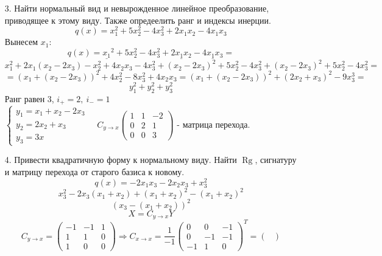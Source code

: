 \documentclass[12pt, letterpaper, twoside]{article}
\newcommand{\Rg}{\operatorname{Rg}}
\begin{document}
        \begin{enumerate}
            \item[3.] Найти нормальный вид и невырожденное линейное преобразование, приводящее к этому виду. Также опредеелить ранг и индексы инерции.
            \[q(x) = x_1^2 + 5x^2_2 - 4x_3^2 + 2x_1x_2 - 4x_1x_3\]
            Вынесем $x_1$:
            \[q(x) = \underline{x_1}^2 + 5x^2_2 - 4x_3^2 + \underline{2x_1x_2} - \underline{4x_1x_3} =\]
            \[x_1^2 + 2x_1(x_2 - 2x_3) - x_2^2 + 4x_2x_3 - 4x_3^2 + (x_2 - 2x_3)^2 + 5x_2^2 - 4x_3^2 + (x_2 - 2x_3)^2 + 5x_2^2 - 4x_3^2=\]
            \[=(x_1 + (x_2 - 2x_3))^2 + 4x^2_2 - 8x_3^2 + 4x_2x_3 = (x_1 + (x_2 - 2x_3))^2 + (2x_2 + x_3)^2 - 9x_3^3 =\]
            \[y_1^2 + y_2^2 + y_3^2\]
            Ранг равен 3, $i_+ = 2,\ i_- = 1$\\
            $\begin{cases}
                y_1 = x_1 + x_2 - 2x_3\\
                y_2 = 2x_2 + x_3\\
                y_3 = 3x 
            \end{cases}\quad C_{y\rightarrow x} \begin{pmatrix}
                1 & 1 & -2\\
                0 & 2 & 1\\
                0 & 0 & 3
            \end{pmatrix}$ - матрица перехода.
            \item[4.] Привести квадратичную форму к нормальному виду. Найти $\Rg$, сигнатуру и матрицу перехода от старого базиса к новому.\\
            \[q(x) = -2x_1 x_3 - 2x_2 x_3 + x_3^2\]
            \[x^2_3 - 2x_3(x_1 + x_2) + (x_1 + x_2)^2 - (x_1 + x_2)^2\]
            \[(x_3 - (x_1 + x_2))^2\]
            \[X = C_{y\rightarrow x} Y\]
            \[C_{y\rightarrow x} = \begin{pmatrix}
                -1 & -1 & 1\\
                1 & 1 & 0\\
                1 & 0 & 0
            \end{pmatrix}\Rightarrow C_{x\rightarrow x} = \frac{1}{-1}\begin{pmatrix}
                0 & 0 & -1\\
                0 & -1 & -1\\
                -1 & 1 & 0
            \end{pmatrix}^T = \begin{pmatrix}

\end{pmatrix}\]
\end{enumerate}
\end{document}
